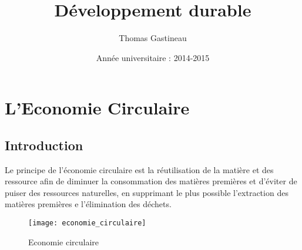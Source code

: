 \documentclass[a4paper,11pt]{report}
\title{Développement durable}
\date{Année universitaire :  2014-2015}
\author{Thomas Gastineau}
\begin{document}
\maketitle  %
\newpage  %

 \setcounter{page}{1} %


\newpage
\null
\thispagestyle{empty}
\newpage

{\tableofcontents} 
\listoffigures


\newpage

\chapter*{L'Economie Circulaire}
\section*{Introduction}
 \setcounter{page}{1} %

Le principe de l'économie circulaire est la réutilisation de la matière et des ressource afin de diminuer la consommation des matières premières et d'éviter de puiser des ressources naturelles, en supprimant le plus possible l'extraction des matières premières e l'élimination des déchets.
\begin{figure}[!h]
\begin{center}
\texttt{[image: economie\_circulaire]} 
\caption{\label{donkey}Economie circulaire}
\end{center}
\end{figure}

 


\end{document}
